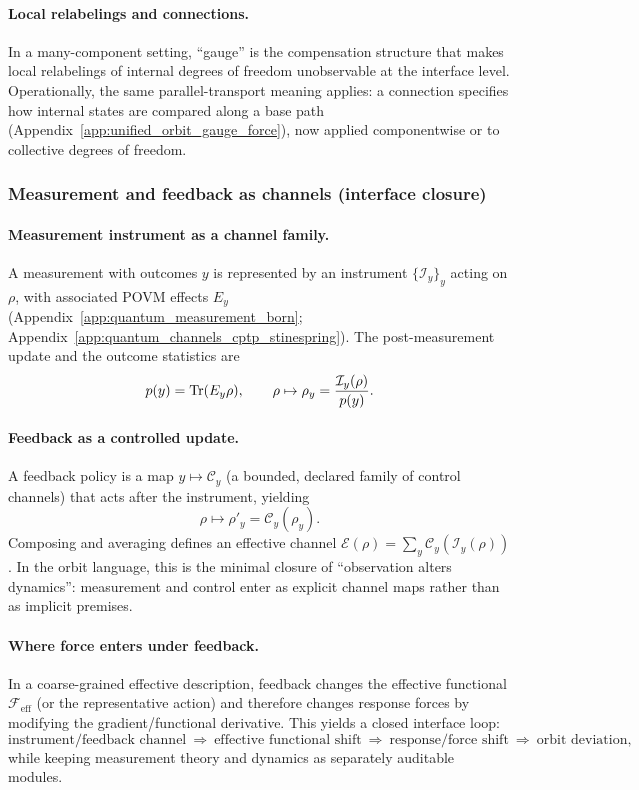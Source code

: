 \paragraph{Local relabelings and connections.}
\InterfaceTag In a many-component setting, ``gauge'' is the compensation structure that makes local relabelings of internal degrees of freedom unobservable at the interface level.
Operationally, the same parallel-transport meaning applies: a connection specifies how internal states are compared along a base path (Appendix~\ref{app:unified_orbit_gauge_force}), now applied componentwise or to collective degrees of freedom.

\subsubsection{Measurement and feedback as channels (interface closure)}
\paragraph{Measurement instrument as a channel family.}
\InterfaceTag A measurement with outcomes $y$ is represented by an instrument $\{\mathcal{I}_y\}_y$ acting on $\rho$, with associated POVM effects $E_y$ (Appendix~\ref{app:quantum_measurement_born}; Appendix~\ref{app:quantum_channels_cptp_stinespring}).
The post-measurement update and the outcome statistics are
\[
p(y)=\mathrm{Tr}(E_y\rho),\qquad
\rho\mapsto \rho_y=\frac{\mathcal{I}_y(\rho)}{p(y)}.
\]

\paragraph{Feedback as a controlled update.}
\InterfaceTag A feedback policy is a map $y\mapsto \mathcal{C}_y$ (a bounded, declared family of control channels) that acts after the instrument, yielding
\[
\rho\mapsto \rho'_y=\mathcal{C}_y(\rho_y).
\]
Composing and averaging defines an effective channel $\mathcal{E}(\rho)=\sum_y \mathcal{C}_y(\mathcal{I}_y(\rho))$.
In the orbit language, this is the minimal closure of ``observation alters dynamics'': measurement and control enter as explicit channel maps rather than as implicit premises.

\paragraph{Where force enters under feedback.}
\AuditTag In a coarse-grained effective description, feedback changes the effective functional $\mathcal{F}_{\mathrm{eff}}$ (or the representative action) and therefore changes response forces by modifying the gradient/functional derivative.
This yields a closed interface loop:
\[
\text{instrument/feedback channel} \ \Rightarrow\ \text{effective functional shift}\ \Rightarrow\ \text{response/force shift}\ \Rightarrow\ \text{orbit deviation},
\]
while keeping measurement theory and dynamics as separately auditable modules.

